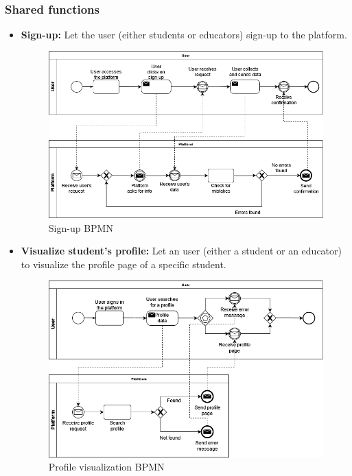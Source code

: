 \documentclass{article}
\begin{document}
{    \subsubsection{Shared functions}
        \begin{itemize}
            \item \textbf{Sign-up:} Let the user (either students or educators) sign-up to the platform.
            \begin{figure}[H]
                \centering
                \includegraphics[scale=0.4]{images/BPMN/BPMN1.png}
                \caption{Sign-up BPMN}
                \label{fig:signUpBPMN}
            \end{figure}

            \item \textbf{Visualize student's profile:} Let an user (either a student or an educator) to visualize the profile page of a specific student.
            \begin{figure}[H]
                \centering
                \includegraphics[scale=0.4]{images/BPMN/BPMN2.png}
                \caption{Profile visualization BPMN}
                \label{fig:profileVisualizationBPMN}
            \end{figure}
        \end{itemize}

}
\end{document}
